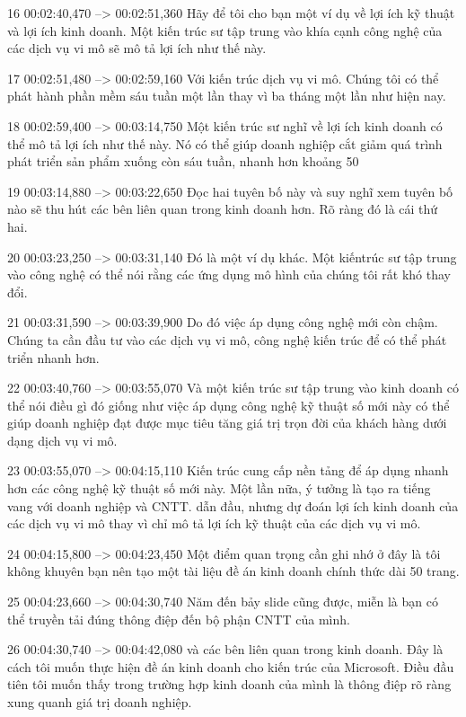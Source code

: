 16
00:02:40,470 --> 00:02:51,360
Hãy để tôi cho bạn một ví dụ về lợi ích kỹ thuật và lợi ích kinh doanh.  Một kiến ​​trúc sư tập trung vào khía cạnh công nghệ của các dịch vụ vi mô sẽ mô tả lợi ích như thế này.

17
00:02:51,480 --> 00:02:59,160
Với kiến ​​trúc dịch vụ vi mô.  Chúng tôi có thể phát hành phần mềm sáu tuần một lần thay vì ba tháng một lần như hiện nay.

18
00:02:59,400 --> 00:03:14,750
Một kiến ​​trúc sư nghĩ về lợi ích kinh doanh có thể mô tả lợi ích như thế này.  Nó có thể giúp doanh nghiệp cắt giảm quá trình phát triển sản phẩm xuống còn sáu tuần, nhanh hơn khoảng 50%

19
00:03:14,880 --> 00:03:22,650
Đọc hai tuyên bố này và suy nghĩ xem tuyên bố nào sẽ thu hút các bên liên quan trong kinh doanh hơn.  Rõ ràng đó là cái thứ hai.

20
00:03:23,250 --> 00:03:31,140
Đó là một ví dụ khác.  Một kiến ​​trúc sư tập trung vào công nghệ có thể nói rằng các ứng dụng mô hình của chúng tôi rất khó thay đổi.

21
00:03:31,590 --> 00:03:39,900
Do đó việc áp dụng công nghệ mới còn chậm.  Chúng ta cần đầu tư vào các dịch vụ vi mô, công nghệ kiến ​​trúc để có thể phát triển nhanh hơn.

22
00:03:40,760 --> 00:03:55,070
Và một kiến ​​trúc sư tập trung vào kinh doanh có thể nói điều gì đó giống như việc áp dụng công nghệ kỹ thuật số mới này có thể giúp doanh nghiệp đạt được mục tiêu tăng giá trị trọn đời của khách hàng dưới dạng dịch vụ vi mô.

23
00:03:55,070 --> 00:04:15,110
Kiến trúc cung cấp nền tảng để áp dụng nhanh hơn các công nghệ kỹ thuật số mới này.  Một lần nữa, ý tưởng là tạo ra tiếng vang với doanh nghiệp và CNTT.  dẫn đầu, nhưng dự đoán lợi ích kinh doanh của các dịch vụ vi mô thay vì chỉ mô tả lợi ích kỹ thuật của các dịch vụ vi mô.

24
00:04:15,800 --> 00:04:23,450
Một điểm quan trọng cần ghi nhớ ở đây là tôi không khuyên bạn nên tạo một tài liệu đề án kinh doanh chính thức dài 50 trang.

25
00:04:23,660 --> 00:04:30,740
Năm đến bảy slide cũng được, miễn là bạn có thể truyền tải đúng thông điệp đến bộ phận CNTT của mình.

26
00:04:30,740 --> 00:04:42,080
và các bên liên quan trong kinh doanh.  Đây là cách tôi muốn thực hiện đề án kinh doanh cho kiến ​​trúc của Microsoft.  Điều đầu tiên tôi muốn thấy trong trường hợp kinh doanh của mình là thông điệp rõ ràng xung quanh giá trị doanh nghiệp.

